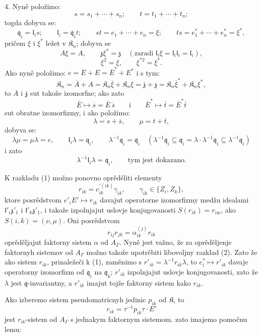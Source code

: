 \documentclass[11pt]{article}
\begin{document}
4. Nyně položimo:
\[
s=s_1+\cdots+s_n;\qquad t=t_1+\cdots+t_n;
\]
togda dobyva se:
\[
\mathfrak q_i=\mathfrak l_is;\qquad
\mathfrak l_i=\mathfrak q_it;\qquad
st=e_1+\cdots+e_n=\xi;\qquad
ts=e_1^*+\cdots+e_n^*=\xi^*,
\]
pričem \(\xi\) i \(\xi^*\) ležet v \(\mathfrak K_n\); dobyva se
\[
A\xi=A,\qquad \mathfrak z\xi^*=\mathfrak z\quad
(\text{zaradi }\mathfrak l_i\xi=\mathfrak l_i\mathfrak l_i=\mathfrak l_i),
\]
\[
\xi^2=\xi,\qquad \xi^{*2}=\xi^*.
\]
Ako nyně položimo: \(e=\overline E+E=\overline E^*+E^*\) i s tym:
\[
\mathfrak K_n=\overline A+A
=\mathfrak K_n\overline\xi+\mathfrak K_n\xi
=\overline{\mathfrak z}+\mathfrak z
=\mathfrak K_n\overline\xi^*+\mathfrak K_n\xi^*,
\]
to \(\overline A\) i \(\overline{\mathfrak z}\) sut takože izomorfne; ako zato
\[
\overline E\mapsto\overline s=\overline E\,\overline s
\qquad\text{i}\qquad
\overline E^*\mapsto\overline t=\overline E^*\overline t
\]
sut obratne izomorfizmy, i ako položimo:
\[
\lambda=s+\overline s,\qquad \mu=t+\overline t,
\]
dobyva se:
\[
\lambda\mu=\mu\lambda=e,\qquad
\mathfrak l_i\lambda=\mathfrak q_i,\qquad
\lambda^{-1}\mathfrak q_i=\mathfrak q_i
\quad
(\lambda^{-1}\mathfrak q_i\subseteq\mathfrak q_i
=\lambda\cdot\lambda^{-1}\mathfrak q_i\subseteq\lambda^{-1}\mathfrak q_i)
\]
i zato
\[
\lambda^{-1}\mathfrak l_i\lambda=\mathfrak q_i,\qquad \text{tym jest dokazano.}
\]

K razkladu (1) možno ponovno oprěděliti elementy
\[
r_{ik}=c_{ik}^{\prime(ik)}\gamma_{ik},\qquad \gamma_{ik}\in\{Z_i,Z_k\},
\]
ktore posrědstvom \(e'_iE'\mapsto r_{ik}\) davajut operatorne izomorfizmy medžu idealami \(\mathfrak l'_i\mathfrak z'_1\) i \(\mathfrak l'_k\mathfrak z'_1\), i takože izpolnjajut uslovje konjugovanosti \(S(r_{ik})=r_{\nu\mu}\), ako \(S(i,k)=(\nu,\mu)\). Oni posrědstvom
\[
r_{ij}r_{jk}=\alpha_{ik}^{(j)}r_{ik}
\]
oprěděljajut faktorny sistem \(\alpha\) od \(A_\Gamma\). Nyně jest važno, že za oprěděljenje faktornyh sistemov od \(A_\Gamma\) možno takože upotrěbiti libovoljny razklad (2). Zato že ako sistem \(r_{ik}\), prinaležeči k (1), zaměnimo s \(r'_{ik}=\lambda^{-1}r_{ik}\lambda\), to \(e_i^*\mapsto r'_{ik}\) davaje operatorny izomorfizm od \(\mathfrak q_i\) na \(\mathfrak q_k\); \(r'_{ik}\) izpolnjajut uslovje konjugovanosti, zato že \(\lambda\) jest \(\mathfrak q\)-invariantny, a \(r'_{ik}\) imajut tojže faktorny sistem kako \(r_{ik}\).

Ako izberemo sistem pseudomatricnyh jedinic \(p_{ik}\) od \(\mathfrak K\), to
\[
r_{ik}=\tau^{-1}p_{ik}\tau\cdot E'
\]
jest \(r_{ik}\)-sistem od \(A_\Gamma\) s jednakym faktornym sistemom. zato imajemo pomočnu lemu:
\end{document}
